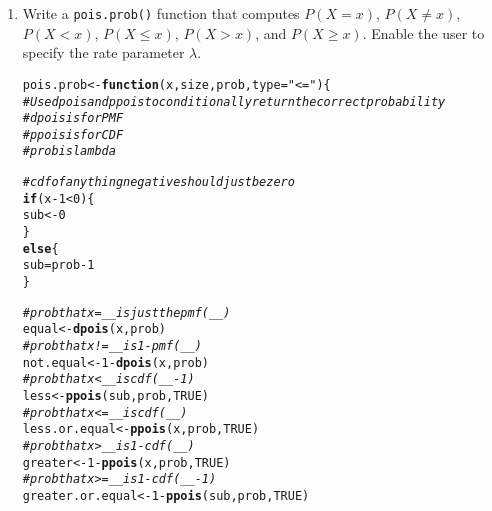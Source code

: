\documentclass{article}\usepackage[]{graphicx}\usepackage[]{xcolor}
\makeatletter
\newcommand{\hlnum}[1]{\textcolor[rgb]{0.686,0.059,0.569}{#1}}%
\newcommand{\hlsng}[1]{\textcolor[rgb]{0.192,0.494,0.8}{#1}}%
\newcommand{\hlcom}[1]{\textcolor[rgb]{0.678,0.584,0.686}{\textit{#1}}}%
\newcommand{\hlopt}[1]{\textcolor[rgb]{0,0,0}{#1}}%
\newcommand{\hldef}[1]{\textcolor[rgb]{0.345,0.345,0.345}{#1}}%
\newcommand{\hlkwa}[1]{\textcolor[rgb]{0.161,0.373,0.58}{\textbf{#1}}}%
\newcommand{\hlkwb}[1]{\textcolor[rgb]{0.69,0.353,0.396}{#1}}%
\newcommand{\hlkwc}[1]{\textcolor[rgb]{0.333,0.667,0.333}{#1}}%
\newcommand{\hlkwd}[1]{\textcolor[rgb]{0.737,0.353,0.396}{\textbf{#1}}}%
\newenvironment{kframe}{%
 \def\at@end@of@kframe{}%
 \ifinner\ifhmode%
  \def\at@end@of@kframe{\end{minipage}}%
  \begin{minipage}{\columnwidth}%
 \fi\fi%
 \def\FrameCommand##1{\hskip\@totalleftmargin \hskip-\fboxsep
 \colorbox{shadecolor}{##1}\hskip-\fboxsep
     \hskip-\linewidth \hskip-\@totalleftmargin \hskip\columnwidth}%
 \MakeFramed {\advance\hsize-\width
   \@totalleftmargin\z@ \linewidth\hsize
   \@setminipage}}%
 {\par\unskip\endMakeFramed%
 \at@end@of@kframe}
\newenvironment{knitrout}{}{} %
\makeatother
\begin{document}
  \begin{enumerate}
    \item Write a \texttt{pois.prob()} function that computes $P(X=x)$, 
    $P(X \neq x)$, $P(X<x)$, $P(X \leq x)$, $P(X > x)$, and $P(X \geq x).$ Enable the user to specify the rate parameter $\lambda$.
\begin{knitrout}\scriptsize
{}\color{fgcolor}\begin{kframe}
\begin{alltt}
\hldef{pois.prob} \hlkwb{<-} \hlkwa{function}\hldef{(}\hlkwc{x}\hldef{,} \hlkwc{size}\hldef{,} \hlkwc{prob}\hldef{,} \hlkwc{type}\hldef{=}\hlsng{"<="}\hldef{)\{}
  \hlcom{# Use dpois and ppois to conditionally return the correct probability}
  \hlcom{#dpois is for PMF}
  \hlcom{#ppois is for CDF}
  \hlcom{# prob is lambda}

  \hlcom{#cdf of anything negative should just be zero}
  \hlkwa{if} \hldef{(x}\hlopt{-}\hlnum{1} \hlopt{<} \hlnum{0}\hldef{)\{}
    \hldef{sub} \hlkwb{<-} \hlnum{0}
  \hldef{\}}
  \hlkwa{else}\hldef{\{}
    \hldef{sub}\hlkwb{=}\hldef{prob}\hlopt{-}\hlnum{1}
  \hldef{\}}

  \hlcom{#prob that x=__ is just the pmf(__)}
  \hldef{equal} \hlkwb{<-} \hlkwd{dpois}\hldef{(x,prob)}
  \hlcom{#prob that x!=__ is 1-pmf(__)}
  \hldef{not.equal} \hlkwb{<-} \hlnum{1}\hlopt{-} \hlkwd{dpois}\hldef{(x,prob)}
  \hlcom{#prob that x<__ is cdf(__ - 1)}
  \hldef{less} \hlkwb{<-} \hlkwd{ppois}\hldef{(sub,prob,}\hlnum{TRUE}\hldef{)}
  \hlcom{#prob that x <= __ is cdf(__)}
  \hldef{less.or.equal} \hlkwb{<-} \hlkwd{ppois}\hldef{(x,prob,}\hlnum{TRUE}\hldef{)}
  \hlcom{#prob that x> __ is 1-cdf(__)}
  \hldef{greater} \hlkwb{<-} \hlnum{1}\hlopt{-} \hlkwd{ppois}\hldef{(x,prob,}\hlnum{TRUE}\hldef{)}
  \hlcom{#prob that x>= __ is 1-cdf(__-1)}
  \hldef{greater.or.equal} \hlkwb{<-} \hlnum{1}\hlopt{-}\hlkwd{ppois}\hldef{(sub,prob,}\hlnum{TRUE}\hldef{)}


\end{alltt}
\end{kframe}
\end{knitrout}
\end{enumerate}
\end{document}
